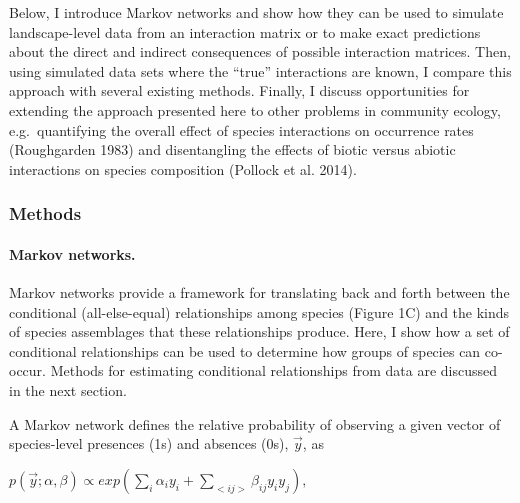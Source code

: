 \documentclass[12pt,]{article}
\begin{document}
\begin{spacing}{1.9}
\begin{flushleft}
Below, I introduce Markov networks and show how they can be used to
simulate landscape-level data from an interaction matrix or to make
exact predictions about the direct and indirect consequences of possible
interaction matrices. Then, using simulated data sets where the ``true''
interactions are known, I compare this approach with several existing
methods. Finally, I discuss opportunities for extending the approach
presented here to other problems in community ecology, e.g.~quantifying
the overall effect of species interactions on occurrence rates
(Roughgarden 1983) and disentangling the effects of biotic versus
abiotic interactions on species composition (Pollock et al. 2014).

\subsubsection{Methods}\label{methods}

\paragraph{Markov networks.}\label{markov-networks.}

Markov networks provide a framework for translating back and forth
between the conditional (all-else-equal) relationships among species
(Figure 1C) and the kinds of species assemblages that these
relationships produce. Here, I show how a set of conditional
relationships can be used to determine how groups of species can
co-occur. Methods for estimating conditional relationships from data are
discussed in the next section.

A Markov network defines the relative probability of observing a given
vector of species-level presences (1s) and absences (0s), \(\vec{y}\),
as

\centering

\(p(\vec{y}; \alpha, \beta) \propto exp(\sum_{i}\alpha_i y_i + \sum_{<ij>}\beta_{ij}y_i y_j),\)

\raggedright
\setlength{\parindent}{1cm}


\end{flushleft}
\end{spacing}
\end{document}
